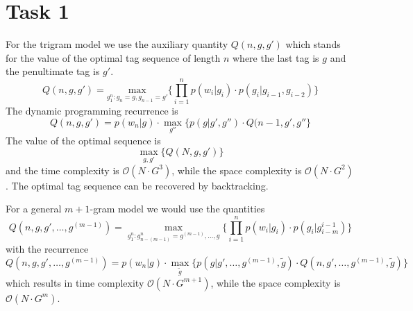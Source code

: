 \documentclass[%
   11pt,              %
   ngerman,           %
   a4paper,           %
   DIV11,             %
]{scrartcl}%
\begin{document}
\section*{Task 1}
For the trigram model we use the auxiliary quantity $Q(n,g,g')$ which stands for the value of the optimal tag sequence of length $n$ where the last tag is $g$ and the penultimate tag is $g'$.
\begin{equation*}
	Q(n,g,g') = \underset{g_1^n: g_n = g, g_{n-1}=g'}{\text{max}}\{\prod_{i=1}^n p(w_i|g_i) \cdot p(g_i|g_{i-1},g_{i-2})\}
\end{equation*}
The dynamic programming recurrence is
\begin{equation*}
	Q(n,g,g') = p(w_n|g) \cdot \underset{g''}{\max}\{p(g|g',g'') \cdot Q(n-1,g',g''\}
\end{equation*}
The value of the optimal sequence is
\begin{equation*}
	\underset{g,g'}{\max}\{Q(N,g,g')\}
\end{equation*}
and the time complexity is $\mathcal{O}(N \cdot G^3)$, while the space complexity is $\mathcal{O}(N \cdot G^2)$. The optimal tag sequence can be recovered by backtracking. \par
For a general $m+1$-gram model we would use the quantities
\begin{equation*}
	Q(n,g,g',\ldots,g^{(m-1)}) = \underset{g_1^n: g_{n-(m-1)}^n = g^{(m-1)},\ldots, g}{\max}\{\prod_{i=1}^n p(w_i|g_i) \cdot p(g_i|g_{i-m}^{i-1}) \}
\end{equation*}
with the recurrence
\begin{equation*}
	Q(n,g,g',\ldots,g^{(m-1)}) = p(w_n|g) \cdot \underset{\tilde{g}}{\max}\{p(g|g',\ldots,g^{(m-1)},\tilde{g}) \cdot Q(n,g',\ldots,g^{(m-1)},\tilde{g})\}
\end{equation*}
which results in time complexity $\mathcal{O}(N \cdot G^{m+1})$, while the space complexity is $\mathcal{O}(N \cdot G^m)$.
\end{document}
